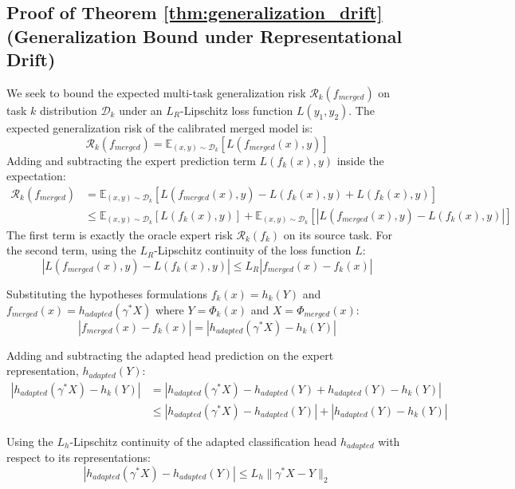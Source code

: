 \documentclass{article}
\theoremstyle{plain}
\theoremstyle{definition}
\theoremstyle{remark}
\begin{document}
\subsection{Proof of Theorem \ref{thm:generalization_drift} (Generalization Bound under Representational Drift)}
We seek to bound the expected multi-task generalization risk $\mathcal{R}_k(f_{merged})$ on task $k$ distribution $\mathcal{D}_k$ under an $L_R$-Lipschitz loss function $L(y_1, y_2)$.
The expected generalization risk of the calibrated merged model is:
$$\mathcal{R}_k(f_{merged}) = \mathbb{E}_{(x, y) \sim \mathcal{D}_k} \left[ L\left( f_{merged}(x), y \right) \right]$$
Adding and subtracting the expert prediction term $L(f_k(x), y)$ inside the expectation:
\begin{align*}
\mathcal{R}_k(f_{merged}) &= \mathbb{E}_{(x, y) \sim \mathcal{D}_k} \left[ L\left( f_{merged}(x), y \right) - L\left( f_k(x), y \right) + L\left( f_k(x), y \right) \right] \\
&\le \mathbb{E}_{(x, y) \sim \mathcal{D}_k} \left[ L\left( f_k(x), y \right) \right] + \mathbb{E}_{(x, y) \sim \mathcal{D}_k} \left[ \left| L\left( f_{merged}(x), y \right) - L\left( f_k(x), y \right) \right| \right]
\end{align*}
The first term is exactly the oracle expert risk $\mathcal{R}_k(f_k)$ on its source task.
For the second term, using the $L_R$-Lipschitz continuity of the loss function $L$:
$$\left| L\left( f_{merged}(x), y \right) - L\left( f_k(x), y \right) \right| \le L_R \left| f_{merged}(x) - f_k(x) \right|$$

Substituting the hypotheses formulations $f_k(x) = h_k(Y)$ and $f_{merged}(x) = h_{adapted}(\gamma^* X)$ where $Y = \Phi_k(x)$ and $X = \Phi_{merged}(x)$:
$$\left| f_{merged}(x) - f_k(x) \right| = \left| h_{adapted}(\gamma^* X) - h_k(Y) \right|$$

Adding and subtracting the adapted head prediction on the expert representation, $h_{adapted}(Y)$:
\begin{align*}
\left| h_{adapted}(\gamma^* X) - h_k(Y) \right| &= \left| h_{adapted}(\gamma^* X) - h_{adapted}(Y) + h_{adapted}(Y) - h_k(Y) \right| \\
&\le \left| h_{adapted}(\gamma^* X) - h_{adapted}(Y) \right| + \left| h_{adapted}(Y) - h_k(Y) \right|
\end{align*}

Using the $L_h$-Lipschitz continuity of the adapted classification head $h_{adapted}$ with respect to its representations:
$$\left| h_{adapted}(\gamma^* X) - h_{adapted}(Y) \right| \le L_h \| \gamma^* X - Y \|_2$$
\end{document}
